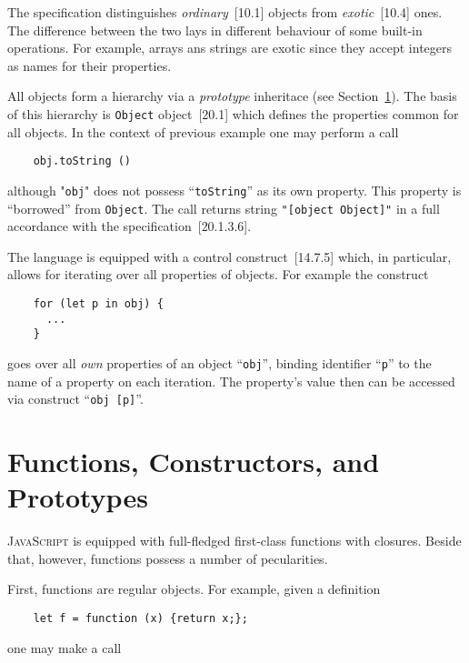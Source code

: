 \documentclass{article}
\newcommand{\js}{\textsc{JavaScript}\xspace}
\newcommand{\rf}[1]{[\textsc{#1}]}
\newcommand{\out}[1]{\texttt{#1}}
\begin{document}
The specification distinguishes \emph{ordinary}~\rf{10.1} objects from \emph{exotic}~\rf{10.4} ones. The difference between the
two lays in different behaviour of some built-in operations. For example, arrays ans strings are exotic since they
accept integers as names for their properties.

All objects form a hierarchy via a \emph{prototype} inheritace (see Section~\ref{sec:prototype}). The basis of
this hierarchy is \lstinline|Object| object~\rf{20.1} which defines the properties common for all objects.
In the context of previous example one may perform a call

\begin{lstlisting}
    obj.toString ()
\end{lstlisting}

although "\lstinline|obj|" does not possess ``\lstinline|toString|'' as its own property. This property is ``borrowed''
from \lstinline|Object|. The call returns string \out{"[object Object]"} in a full accordance with the
specification~\rf{20.1.3.6}.

The language is equipped with a control construct~\rf{14.7.5} which, in particular, allows for iterating over
all properties of objects. For example the construct

\begin{lstlisting}
    for (let p in obj) {
      ...
    }
\end{lstlisting}

goes over all \emph{own} properties of an object ``\lstinline|obj|'', binding identifier ``\lstinline|p|'' to the
name of a property on each iteration. The property's value then can be accessed via construct ``\lstinline|obj [p]|''.

\section{Functions, Constructors, and Prototypes}
\label{sec:prototype}

\js is equipped with full-fledged first-class functions with closures. Beside that, however, functions possess a number of pecularities.

First, functions are regular objects. For example, given a definition

\begin{lstlisting}
    let f = function (x) {return x;};
\end{lstlisting}

one may make a call
\end{document}
